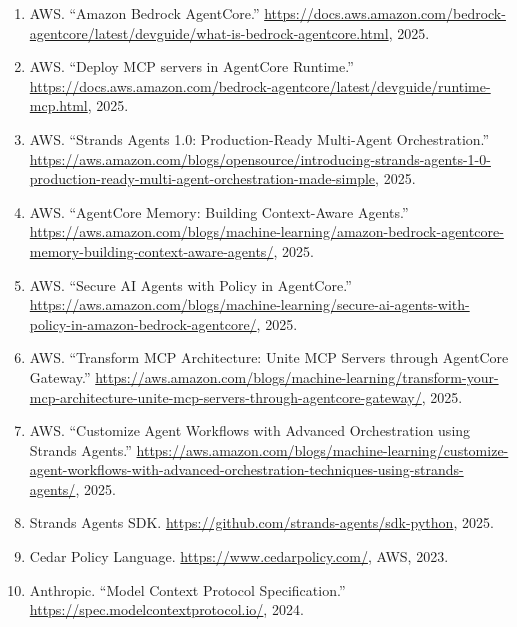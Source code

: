 \documentclass[11pt,letterpaper]{article}
\begin{document}
\begin{enumerate}[noitemsep]
    \item AWS. ``Amazon Bedrock AgentCore.''
          \url{https://docs.aws.amazon.com/bedrock-agentcore/latest/devguide/what-is-bedrock-agentcore.html}, 2025.
    \item AWS. ``Deploy MCP servers in AgentCore Runtime.''
          \url{https://docs.aws.amazon.com/bedrock-agentcore/latest/devguide/runtime-mcp.html}, 2025.
    \item AWS. ``Strands Agents 1.0: Production-Ready Multi-Agent Orchestration.''
          \url{https://aws.amazon.com/blogs/opensource/introducing-strands-agents-1-0-production-ready-multi-agent-orchestration-made-simple}, 2025.
    \item AWS. ``AgentCore Memory: Building Context-Aware Agents.''
          \url{https://aws.amazon.com/blogs/machine-learning/amazon-bedrock-agentcore-memory-building-context-aware-agents/}, 2025.
    \item AWS. ``Secure AI Agents with Policy in AgentCore.''
          \url{https://aws.amazon.com/blogs/machine-learning/secure-ai-agents-with-policy-in-amazon-bedrock-agentcore/}, 2025.
    \item AWS. ``Transform MCP Architecture: Unite MCP Servers through AgentCore Gateway.''
          \url{https://aws.amazon.com/blogs/machine-learning/transform-your-mcp-architecture-unite-mcp-servers-through-agentcore-gateway/}, 2025.
    \item AWS. ``Customize Agent Workflows with Advanced Orchestration using Strands Agents.''
          \url{https://aws.amazon.com/blogs/machine-learning/customize-agent-workflows-with-advanced-orchestration-techniques-using-strands-agents/}, 2025.
    \item Strands Agents SDK. \url{https://github.com/strands-agents/sdk-python}, 2025.
    \item Cedar Policy Language. \url{https://www.cedarpolicy.com/}, AWS, 2023.
    \item Anthropic. ``Model Context Protocol Specification.''
          \url{https://spec.modelcontextprotocol.io/}, 2024.
\end{enumerate}
\end{document}
